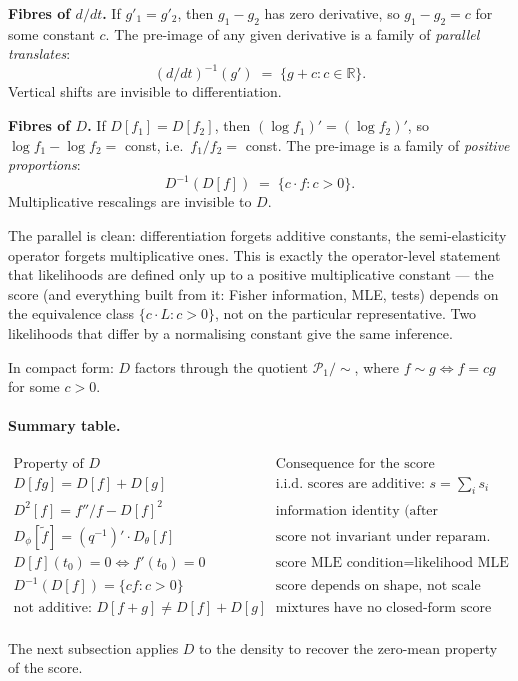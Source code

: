 \documentclass[a4paper,oneside,12pt]{extarticle}
\theoremstyle{plain}
\theoremstyle{definition}
\theoremstyle{remark}
\begin{document}
\textbf{Fibres of $d/dt$.}
If $g'_1 = g'_2$, then $g_1 - g_2$ has zero derivative, so
$g_1 - g_2 = c$ for some constant $c$.  The pre-image of any given
derivative is a family of \emph{parallel translates}:
\[
  (d/dt)^{-1}(g') \;=\; \{g + c : c \in \mathbb{R}\}.
\]
Vertical shifts are invisible to differentiation.

\textbf{Fibres of $D$.}
If $D[f_1] = D[f_2]$, then $(\log f_1)' = (\log f_2)'$, so
$\log f_1 - \log f_2 = $ const, i.e.\ $f_1 / f_2 = $ const.  The
pre-image is a family of \emph{positive proportions}:
\[
  D^{-1}(D[f]) \;=\; \{c \cdot f : c > 0\}.
\]
Multiplicative rescalings are invisible to $D$.

The parallel is clean: differentiation forgets additive constants,
the semi-elasticity operator forgets multiplicative ones.  This is
exactly the operator-level statement that likelihoods are defined
only up to a positive multiplicative constant --- the score (and
everything built from it: Fisher information, MLE, tests) depends
on the equivalence class $\{c \cdot L : c > 0\}$, not on the
particular representative.  Two likelihoods that differ by a
normalising constant give the same inference.

In compact form: $D$ factors through the quotient
$\mathcal{P}_1 / \!\sim$, where $f \sim g \iff f = cg$ for some
$c > 0$.

\paragraph{Summary table.}
\[
\begin{array}{l|l}
\text{Property of } D & \text{Consequence for the score}\\\hline
D[fg] = D[f] + D[g] & \text{i.i.d.\ scores are additive: } s = \sum_i s_i\\
D^2[f] = f''/f - D[f]^2 & \text{information identity (after expectation)}\\
D_\phi[\tilde f] = (q^{-1})'\cdot D_\theta[f] & \text{score not invariant under reparam.}\\
D[f](t_0)=0 \iff f'(t_0)=0 & \text{score MLE condition} = \text{likelihood MLE}\\
D^{-1}(D[f]) = \{cf : c>0\} & \text{score depends on shape, not scale}\\
\text{not additive: } D[f+g] \neq D[f]+D[g] & \text{mixtures have no closed-form score}\\
\end{array}
\]

\noindent The next subsection applies $D$ to the density to recover the
zero-mean property of the score.
\end{document}
